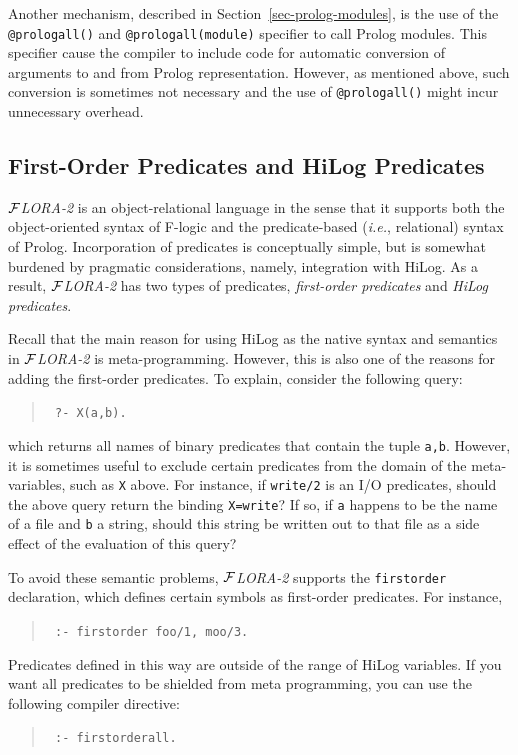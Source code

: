 \documentclass[11pt]{article}
\newcommand{\FLORA}{{\mbox{${\cal F}${\small\it LORA}\rm\emph{-2}}}\xspace}
\newcommand{\fl}{\mbox{F-logic}\xspace}
\begin{document}
Another mechanism, described in Section~\ref{sec-prolog-modules}, is the
use of the {\tt @prologall()} and {\tt @prologall(module)} specifier to
call Prolog modules. This specifier cause the compiler to include code for
automatic conversion of arguments to and from Prolog
representation. However, as mentioned above, such conversion is sometimes
not necessary and the use of {\tt @prologall()} might incur unnecessary
overhead.


\subsection{First-Order Predicates and HiLog Predicates}
\label{sec:flora-modules-predicates}

\FLORA is an object-relational language in the sense that it supports both
the object-oriented syntax of \fl and the predicate-based ({\it i.e.},
relational) syntax of Prolog. Incorporation of predicates is conceptually
simple, but is somewhat burdened by pragmatic considerations, namely,
integration with HiLog. As a result, \FLORA has two types of predicates,
{\em first-order predicates\/} and \emph{HiLog predicates}. 

Recall that the main reason for using HiLog as the native syntax and
semantics in \FLORA is meta-programming. However, this is also one of the
reasons for adding the first-order predicates. To explain, consider the
following query:
\begin{quote}
 \tt
 ?- X(a,b).
\end{quote}
which returns all names of binary predicates that contain
the tuple {\tt a,b}. However, it is sometimes useful to exclude certain
predicates from the domain of the meta-variables, such as {\tt X} above.
For instance, if {\tt write/2}  is an I/O predicates, should the above
query return the binding {\tt X=write}? If so, if {\tt a} happens to be the
name of a file and {\tt b} a string, should this string be written out to
that file as a side effect of the evaluation of this query?

To avoid these semantic problems, \FLORA supports the {\tt firstorder}
declaration, which defines certain symbols as first-order predicates. For
instance,
\begin{quote}
 \tt
 :- firstorder foo/1, moo/3.
\end{quote}
Predicates defined in this way are outside of the range of HiLog variables.
If you want all predicates to be shielded from meta programming, you can use
the following compiler directive:
\begin{quote}
  \tt
  :- firstorderall.
\end{quote}
\end{document}
